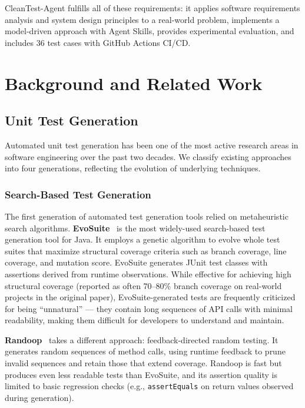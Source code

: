 \documentclass[acmlarge,nonacm,screen]{acmart}
\begin{document}
CleanTest-Agent fulfills all of these requirements: it applies software requirements analysis and system design principles to a real-world problem, implements a model-driven approach with Agent Skills, provides experimental evaluation, and includes 36 test cases with GitHub Actions CI/CD.


\section{Background and Related Work}
\label{sec:background}

\subsection{Unit Test Generation}

Automated unit test generation has been one of the most active research areas in software engineering over the past two decades. We classify existing approaches into four generations, reflecting the evolution of underlying techniques.

\subsubsection{Search-Based Test Generation}

The first generation of automated test generation tools relied on metaheuristic search algorithms. \textbf{EvoSuite}~\cite{fraser2011evosuite} is the most widely-used search-based test generation tool for Java. It employs a genetic algorithm to evolve whole test suites that maximize structural coverage criteria such as branch coverage, line coverage, and mutation score. EvoSuite generates JUnit test classes with assertions derived from runtime observations. While effective for achieving high structural coverage (reported as often 70--80\% branch coverage on real-world projects in the original paper), EvoSuite-generated tests are frequently criticized for being ``unnatural'' --- they contain long sequences of API calls with minimal readability, making them difficult for developers to understand and maintain.

\textbf{Randoop}~\cite{pacheco2007randoop} takes a different approach: feedback-directed random testing. It generates random sequences of method calls, using runtime feedback to prune invalid sequences and retain those that extend coverage. Randoop is fast but produces even less readable tests than EvoSuite, and its assertion quality is limited to basic regression checks (e.g., \texttt{assertEquals} on return values observed during generation).
\end{document}
